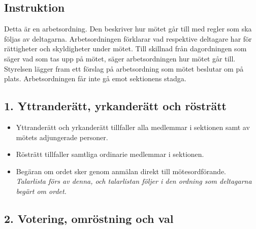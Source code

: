 \documentclass[2019-vm-handlingar.tex]{subfiles}
\begin{document}
     
    \subsection*{Instruktion}

    Detta är en arbetsordning. Den beskriver hur mötet går till med regler som ska följas av deltagarna. Arbetsordningen förklarar vad respektive deltagare har för rättigheter och skyldigheter under mötet. Till skillnad från dagordningen som säger vad som tas upp på mötet, säger arbetsordningen hur mötet går till. Styrelsen lägger fram ett förslag på arbetsordning som mötet beslutar om på plats. Arbetsordningen får inte gå emot sektionens stadga.

    \subsection*{1. Yttranderätt, yrkanderätt och rösträtt}

    \begin{itemize}
    \item Yttranderätt och yrkanderätt tillfaller alla medlemmar i sektionen samt av mötets adjungerade personer.
    \item Rösträtt tillfaller samtliga ordinarie medlemmar i sektionen.
    \item Begäran om ordet sker genom anmälan direkt till mötesordförande.
    \\ \textit{Talarlista förs av denna, och talarlistan följer i den ordning som deltagarna begärt om ordet.}
    \end{itemize}


    \subsection*{2. Votering, omröstning och val}
    
\end{document}
